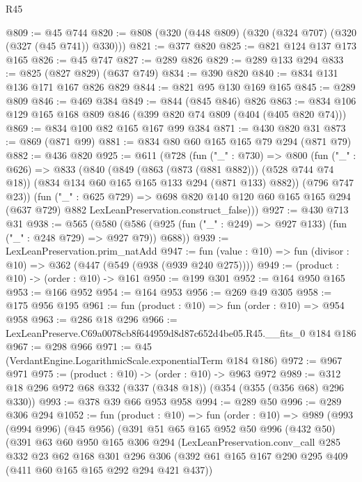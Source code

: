 \begin{lexlean}{R45}
\begin{coremodule}
@809 := @45 @744
@820 := @808 (@320 (@448 @809) (@320 (@324 @707) (@320 (@327 (@45 @741)) @330)))
@821 := @377 @820
@825 := @821 @124 @137 @173 @165
@826 := @45 @747
@827 := @289 @826
@829 := @289 @133 @294
@833 := @825 (@827 @829) (@637 @749)
@834 := @390 @820
@840 := @834 @131 @136 @171 @167 @826 @829
@844 := @821 @95 @130 @169 @165
@845 := @289 @809
@846 := @469 @384
@849 := @844 (@845 @846) @826
@863 := @834 @106 @129 @165 @168 @809 @846 (@399 @820 @74 @809 (@404 (@405 @820 @74)))
@869 := @834 @100 @82 @165 @167 @99 @384
@871 := @430 @820 @31
@873 := @869 (@871 @99)
@881 := @834 @80 @60 @165 @165 @79 @294 (@871 @79)
@882 := @436 @820
@925 := @611
    (@728
      (fun ("_" : @730) =>
      @800
        (fun ("_" : @626) =>
        @833
          (@840
            (@849 (@863 (@873 (@881 @882))) (@528 @744 @74 @18))
            (@834 @134 @60 @165 @165 @133 @294 (@871 @133) @882))
          (@796 @747 @23))
        (fun ("_" : @625 @729) =>
        @698
          @820
          @140
          @120
          @60
          @165
          @165
          @294
          (@637 @729)
          @882
          LexLeanPreservation.construct_false)))
@927 := @430 @713 @31
@938 := @565
    (@580 (@586 (@925 (fun ("_" : @249) => @927 @133) (fun ("_" : @248 @729) => @927 @79)) @688))
@939 := LexLeanPreservation.prim_natAdd
@947 := fun (value : @10) => fun (divisor : @10) => @362 (@447 (@549 (@938 (@939 @240 @275))))
@949 := (product : @10) -> (order : @10) -> @161
@950 := @199 @301
@952 := @164 @950 @165
@953 := @166 @952
@954 := @164 @953
@956 := @269 @49 @305
@958 := @175 @956 @195
@961 := fun (product : @10) => fun (order : @10) => @954 @958
@963 := @286 @18 @296
@966 := LexLeanPreserve.C69a0078cb8f644959d8d87c652d4be05.R45.__fits_0 @184 @186
@967 := @298 @966
@971 := @45 (VerdantEngine.LogarithmicScale.exponentialTerm @184 @186)
@972 := @967 @971
@975 := (product : @10) -> (order : @10) -> @963 @972
@989 := @312 @18 @296 @972 @68 @332 (@337 (@348 @18)) (@354 (@355 (@356 @68) @296 @330))
@993 := @378 @39 @66 @953 @958
@994 := @289 @50
@996 := @289 @306 @294
@1052 := fun (product : @10) =>
  fun (order : @10) =>
  @989
    (@993
      (@994 @996)
      (@45 @956)
      (@391
        @51
        @65
        @165
        @952
        @50
        @996
        (@432 @50)
        (@391
          @63
          @60
          @950
          @165
          @306
          @294
          (LexLeanPreservation.conv_call
            @285
            @332
            @23
            @62
            @168
            @301
            @296
            @306
            (@392 @61 @165 @167 @290 @295 @409 (@411 @60 @165 @165 @292 @294 @421 @437))

\end{coremodule}
\end{lexlean}

